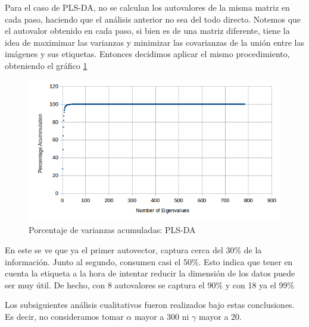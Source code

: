 Para el caso de PLS-DA, no se calculan los autovalores de la misma matriz en cada paso, haciendo que el an\'alisis anterior no sea del todo directo. Notemos que el autovalor obtenido en cada paso, si bien es de una matriz diferente, tiene la idea de maximimar las varianzas y minimizar las covarianzas de la uni\'on entre las im\'agenes y sus etiquetas. Entonces decidimos aplicar el mismo procedimiento, obteniendo el gr\'afico \ref{accum_var_PLSDA}

\newpage

\begin{figure}[h!]
  \begin{center}
	\includegraphics[scale=1]{exp4/PLSDA-percentage.png}
	\caption{Porcentaje de varianzas acumuladas: PLS-DA}
	\label{accum_var_PLSDA}
  \end{center}
\end{figure}

En este se ve que ya el primer autovector, captura cerca del 30\% de la informaci\'on. Junto al segundo, consumen casi el 50\%. Esto indica que tener en cuenta la etiqueta a la hora de intentar reducir la dimensi\'on de los datos puede ser muy \'util. De hecho, con 8 autovalores se captura el 90\% y con 18 ya el 99\%

Los subsiguientes an\'alisis cualitativos fueron realizados bajo estas conclusiones. Es decir, no consideramos tomar $\alpha$ mayor a 300 ni $\gamma$ mayor a 20.